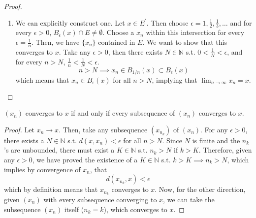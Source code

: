 \begin{proof}
\begin{enumerate}
      \item We can explicitly construct one. Let $x \in E^\prime$. Then choose $\epsilon = 1, \frac{1}{2}, \frac{1}{3}, \ldots$ and for every $\epsilon > 0$, $B_\epsilon (x) \cap E \neq \emptyset$. Choose a $x_n$ within this intersection for every $\epsilon = \frac{1}{n}$. Then, we have $\{x_n\}$ contained in $E$. We want to show that this converges to $x$. Take any $\epsilon > 0$, then there exists $N \in \mathbb{N}$ s.t. $0 < \frac{1}{N} < \epsilon$, and for every $n > N$, $\frac{1}{n} < \frac{1}{N} < \epsilon$.
      \begin{equation}
        n > N \implies x_n \in B_{1/n} (x) \subset B_\epsilon (x)
      \end{equation}
      which means that $x_n \in B_\epsilon (x)$ for all $n > N$, implying that $\lim_{n \rightarrow \infty} x_n = x$. 
    \end{enumerate}
  \end{proof}

  \begin{lemma}
    \label{thm:sequence-converges-iff-every-subsequence}
    $(x_n)$ converges to $x$ if and only if every subsequence of $(x_n)$ converges to $x$. 
  \end{lemma}
  \begin{proof}
    Let $x_n \rightarrow x$. Then, take any subsequence $(x_{n_k})$ of $(x_n)$. For any $\epsilon > 0$, there exists a $N \in \mathbb{N}$ s.t. $d(x, x_n) < \epsilon$ for all $n > N$. Since $N$ is finite and the $n_k$'s are unbounded, there must exist a $K \in \mathbb{N}$ s.t. $n_k > N$ if $k > K$. Therefore, given any $\epsilon > 0$, we have proved the existence of a $K \in \mathbb{N}$ s.t. $k > K \implies n_k > N$, which implies by convergence of $x_n$, that 
    \begin{equation}
      d(x_{n_k}, x) < \epsilon
    \end{equation}
    which by definition means that $x_{n_k}$ converges to $x$. Now, for the other direction, given $(x_n)$ with every subsequence converging to $x$, we can take the subsequence $(x_n)$ itself ($n_k = k$), which converges to $x$. 
  \end{proof}

